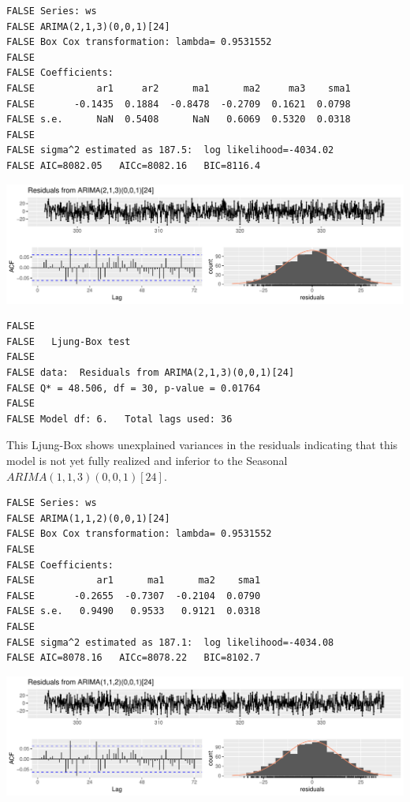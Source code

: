 \documentclass[openany]{book}
\begin{document}
\begin{verbatim}
FALSE Series: ws 
FALSE ARIMA(2,1,3)(0,0,1)[24] 
FALSE Box Cox transformation: lambda= 0.9531552 
FALSE 
FALSE Coefficients:
FALSE           ar1     ar2      ma1      ma2     ma3    sma1
FALSE       -0.1435  0.1884  -0.8478  -0.2709  0.1621  0.0798
FALSE s.e.      NaN  0.5408      NaN   0.6069  0.5320  0.0318
FALSE 
FALSE sigma^2 estimated as 187.5:  log likelihood=-4034.02
FALSE AIC=8082.05   AICc=8082.16   BIC=8116.4
\end{verbatim}

\includegraphics{Group2_Project1_Fall2019_files/figure-latex/unnamed-chunk-26-1.pdf}

\begin{verbatim}
FALSE 
FALSE   Ljung-Box test
FALSE 
FALSE data:  Residuals from ARIMA(2,1,3)(0,0,1)[24]
FALSE Q* = 48.506, df = 30, p-value = 0.01764
FALSE 
FALSE Model df: 6.   Total lags used: 36
\end{verbatim}

This Ljung-Box shows unexplained variances in the residuals indicating
that this model is not yet fully realized and inferior to the Seasonal
\(ARIMA (1,1,3)(0,0,1)[24]\).

\begin{verbatim}
FALSE Series: ws 
FALSE ARIMA(1,1,2)(0,0,1)[24] 
FALSE Box Cox transformation: lambda= 0.9531552 
FALSE 
FALSE Coefficients:
FALSE           ar1      ma1      ma2    sma1
FALSE       -0.2655  -0.7307  -0.2104  0.0790
FALSE s.e.   0.9490   0.9533   0.9121  0.0318
FALSE 
FALSE sigma^2 estimated as 187.1:  log likelihood=-4034.08
FALSE AIC=8078.16   AICc=8078.22   BIC=8102.7
\end{verbatim}

\includegraphics{Group2_Project1_Fall2019_files/figure-latex/unnamed-chunk-27-1.pdf}
\end{document}
